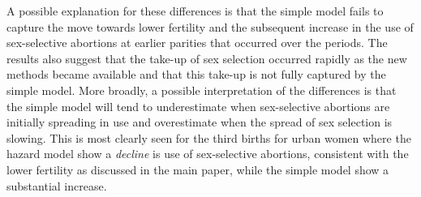 \documentclass[12pt,letterpaper]{article}
\begin{document}
A possible explanation for these differences is that the simple model 
fails to capture the move towards lower fertility and the subsequent 
increase in the use of sex-selective abortions at earlier parities that 
occurred over the periods.
The results also suggest that the take-up of sex selection occurred 
rapidly as the new methods became available and that this take-up
is not fully captured by the simple model.
More broadly, a possible interpretation of the differences is that
the simple model will tend to underestimate when sex-selective abortions
are initially spreading in use and overestimate when the spread of sex 
selection is slowing.
This is most clearly seen for the third births for urban women where
the hazard model show a \emph{decline} is use of sex-selective abortions,
consistent with the lower fertility as discussed in the main paper,
while the simple model show a substantial increase. 



% 
% 
% 
\end{document}
